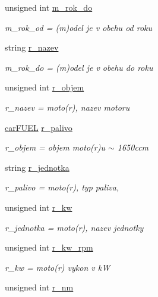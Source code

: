 \begin{DoxyCompactItemize}
unsigned int \hyperlink{structs__carITEM_ad0b03b89f0df3e8b016c84cb8a8ae371}{m\-\_\-rok\-\_\-do}
\begin{DoxyCompactList}\small\item\em m\-\_\-rok\-\_\-od = (m)odel je v obehu od roku \end{DoxyCompactList}\item 
string \hyperlink{structs__carITEM_a114f1162d2b3165c3ce07fa6d128d96b}{r\-\_\-nazev}
\begin{DoxyCompactList}\small\item\em m\-\_\-rok\-\_\-do = (m)odel je v obehu do roku \end{DoxyCompactList}\item 
unsigned int \hyperlink{structs__carITEM_a02056de93d14dc2689a0b5bb3b991817}{r\-\_\-objem}
\begin{DoxyCompactList}\small\item\em r\-\_\-nazev = moto(r), nazev motoru \end{DoxyCompactList}\item 
\hyperlink{io_8h_a5a939c07993e0071f24abc5eeb3e32c1}{car\-F\-U\-E\-L} \hyperlink{structs__carITEM_a381b61a73e3f24bf12eb8db98616d0e6}{r\-\_\-palivo}
\begin{DoxyCompactList}\small\item\em r\-\_\-objem = objem moto(r)u $\sim$ 1650ccm \end{DoxyCompactList}\item 
string \hyperlink{structs__carITEM_ab14179f26f8655f40d4e86950aadff7f}{r\-\_\-jednotka}
\begin{DoxyCompactList}\small\item\em r\-\_\-palivo = moto(r), typ paliva, \end{DoxyCompactList}\item 
unsigned int \hyperlink{structs__carITEM_adebdcb0629c4d2738f06b462caf10576}{r\-\_\-kw}
\begin{DoxyCompactList}\small\item\em r\-\_\-jednotka = moto(r), nazev jednotky \end{DoxyCompactList}\item 
unsigned int \hyperlink{structs__carITEM_ad2a7d41a5464f90aa3faac5216bdaa03}{r\-\_\-kw\-\_\-rpm}
\begin{DoxyCompactList}\small\item\em r\-\_\-kw = moto(r) vykon v k\-W \end{DoxyCompactList}\item 
unsigned int \hyperlink{structs__carITEM_acded6b0c9bcf2c711eb7f127d1fba382}{r\-\_\-nm}

\end{DoxyCompactItemize}
